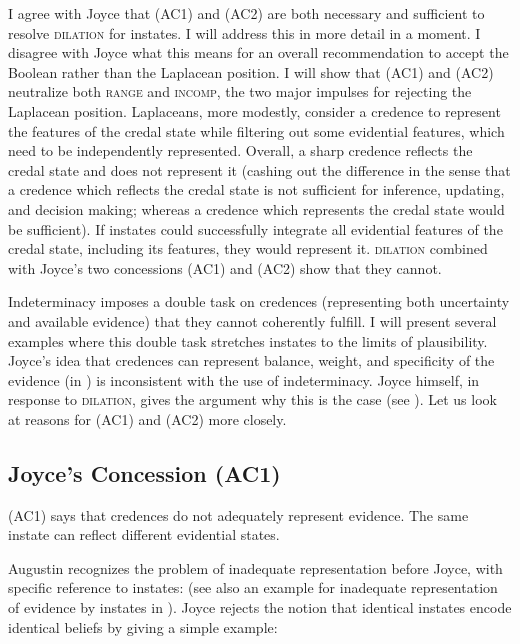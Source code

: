 \documentclass[11pt]{article}
\begin{document}
I agree with Joyce that (AC1) and (AC2) are both necessary and
sufficient to resolve \textsc{dilation} for instates. I will address
this in more detail in a moment. I disagree with Joyce what this means
for an overall recommendation to accept the Boolean rather than the
Laplacean position. I will show that (AC1) and (AC2) neutralize both
\textsc{range} and \textsc{incomp}, the two major impulses for
rejecting the Laplacean position. Laplaceans, more modestly, consider
a credence to represent the {\doxnotep} features of the credal state
while filtering out some evidential features, which need to be
independently represented. Overall, a sharp credence reflects the
credal state and does not represent it (cashing out the difference in
the sense that a credence which reflects the credal state is not
sufficient for inference, updating, and decision making; whereas a
credence which represents the credal state would be sufficient). If
instates could successfully integrate all evidential features of the
credal state, including its {\doxnotep} features, they would represent
it. \textsc{dilation} combined with Joyce's two concessions (AC1) and
(AC2) show that they cannot.

Indeterminacy imposes a double task on credences (representing both
uncertainty and available evidence) that they cannot coherently
fulfill. I will present several examples where this double task
stretches instates to the limits of plausibility. Joyce's idea that
credences can represent balance, weight, and specificity of the
evidence (in ) is inconsistent with the use of
indeterminacy. Joyce himself, in response to \textsc{dilation}, gives
the argument why this is the case (see
). Let us look at reasons for (AC1)
and (AC2) more closely.

\subsection{Joyce's Concession (AC1)}
\label{jj1}

(AC1) says that credences do not adequately represent evidence. The
same instate can reflect different evidential states.

Augustin recognizes the problem of inadequate representation before
Joyce, with specific reference to instates:   (see also an example for
inadequate representation of evidence by instates in
). Joyce rejects the notion that
identical instates encode identical beliefs by giving a simple
example:
\end{document}
